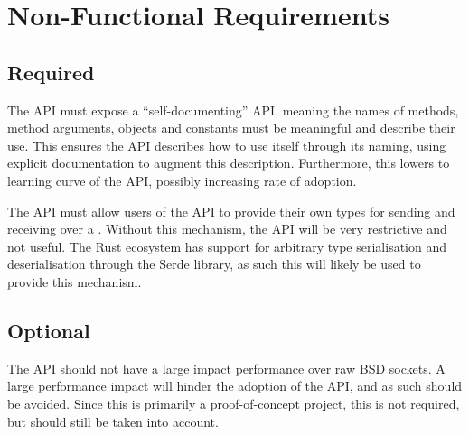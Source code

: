 \section{Non-Functional Requirements}\label{sec:non-functional-requirements}

\subsection{Required}\label{subsec:required2}

The API must expose a “self-documenting” API, meaning the names of methods, method arguments, objects and constants must be
meaningful and describe their use.
This ensures the API describes how to use itself through its naming, using explicit documentation to augment this description.
Furthermore, this lowers to learning curve of the API, possibly increasing rate of adoption.

The API must allow users of the API to provide their own types for sending and receiving over a \connection{}.
Without this mechanism, the API will be very restrictive and not useful.
The Rust ecosystem has support for arbitrary type serialisation and deserialisation through the Serde library, as such this
will likely be used to provide this mechanism.

\subsection{Optional}\label{subsec:optional2}

The API should not have a large impact performance over raw BSD sockets.
A large performance impact will hinder the adoption of the API, and as such should be avoided.
Since this is primarily a proof-of-concept project, this is not required, but should still be taken into account.

